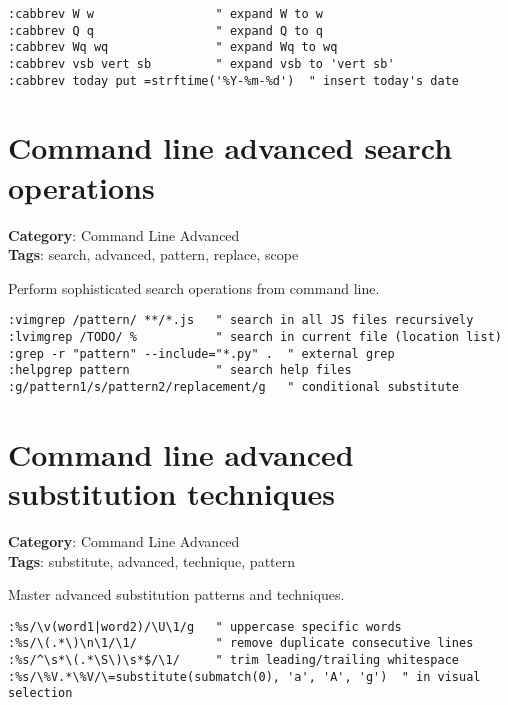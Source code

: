 {{{{\begin{Exa*}{}
\begin{Verbatim}[fontsize=\footnotesize, breaklines, breakanywhere]
:cabbrev W w                 " expand W to w
:cabbrev Q q                 " expand Q to q  
:cabbrev Wq wq               " expand Wq to wq
:cabbrev vsb vert sb         " expand vsb to 'vert sb'
:cabbrev today put =strftime('%Y-%m-%d')  " insert today's date
\end{Verbatim}
\end{Exa*}

\section{Command line advanced search operations}

\textbf{Category}: Command Line Advanced\\ \textbf{Tags}: search, advanced, pattern, replace, scope
\vspace{0.5cm}

Perform sophisticated search operations from command line.

\begin{Exa*}{}
\begin{Verbatim}[fontsize=\footnotesize, breaklines, breakanywhere]
:vimgrep /pattern/ **/*.js   " search in all JS files recursively
:lvimgrep /TODO/ %           " search in current file (location list)
:grep -r "pattern" --include="*.py" .  " external grep
:helpgrep pattern            " search help files
:g/pattern1/s/pattern2/replacement/g   " conditional substitute
\end{Verbatim}
\end{Exa*}

\section{Command line advanced substitution techniques}

\textbf{Category}: Command Line Advanced\\ \textbf{Tags}: substitute, advanced, technique, pattern
\vspace{0.5cm}

Master advanced substitution patterns and techniques.

\begin{Exa*}{}
\begin{Verbatim}[fontsize=\footnotesize, breaklines, breakanywhere]
:%s/\v(word1|word2)/\U\1/g   " uppercase specific words
:%s/\(.*\)\n\1/\1/           " remove duplicate consecutive lines
:%s/^\s*\(.*\S\)\s*$/\1/     " trim leading/trailing whitespace
:%s/\%V.*\%V/\=substitute(submatch(0), 'a', 'A', 'g')  " in visual selection
\end{Verbatim}
\end{Exa*}

}}}}
